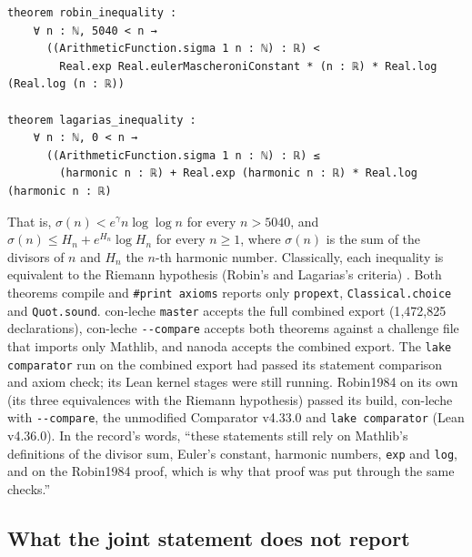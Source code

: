 \noindent\begin{minipage}{\linewidth}
\begin{Verbatim}
theorem robin_inequality :
    ∀ n : ℕ, 5040 < n →
      ((ArithmeticFunction.sigma 1 n : ℕ) : ℝ) <
        Real.exp Real.eulerMascheroniConstant * (n : ℝ) * Real.log (Real.log (n : ℝ))

theorem lagarias_inequality :
    ∀ n : ℕ, 0 < n →
      ((ArithmeticFunction.sigma 1 n : ℕ) : ℝ) ≤
        (harmonic n : ℝ) + Real.exp (harmonic n : ℝ) * Real.log (harmonic n : ℝ)
\end{Verbatim}
\end{minipage}

\noindent That is, $\sigma(n)<e^{\gamma}n\log\log n$ for every $n>5040$, and
$\sigma(n)\le H_n+e^{H_n}\log H_n$ for every $n\ge1$, where $\sigma(n)$ is the sum of the divisors
of $n$ and $H_n$ the $n$-th harmonic number. Classically, each inequality is equivalent to the
Riemann hypothesis (Robin's and Lagarias's criteria) \stcs. Both theorems compile and
\texttt{\#print axioms} reports only \texttt{propext}, \texttt{Classical.choice} and
\texttt{Quot.sound}. con-leche \texttt{master} accepts the full combined export (1{,}472{,}825
declarations), con-leche \texttt{-{}-compare} accepts both theorems against a challenge file that
imports only Mathlib, and nanoda accepts the combined export. The \texttt{lake comparator} run on
the combined export had passed its statement comparison and axiom check; its Lean kernel stages
were still running. Robin1984 on its own (its three equivalences with the
Riemann hypothesis) passed its build, con-leche with \texttt{-{}-compare}, the unmodified
Comparator v4.33.0 and \texttt{lake comparator} (Lean v4.36.0). In the record's words, ``these
statements still rely on Mathlib's definitions of the divisor sum, Euler's constant, harmonic
numbers, \texttt{exp} and \texttt{log}, and on the Robin1984 proof, which is why that proof was put
through the same checks.''

\subsection{What the joint statement does not report}\label{sec:notreported}

